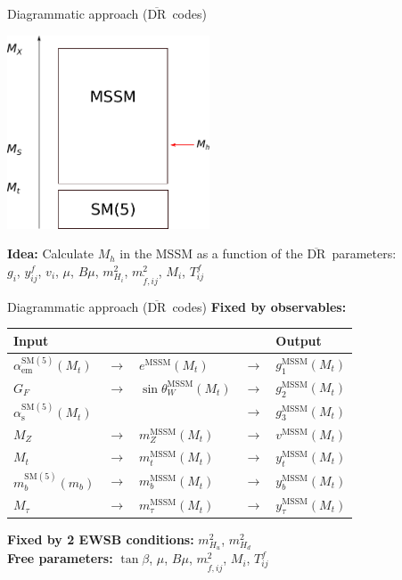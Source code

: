 \documentclass[hyperref={pdfpagelabels=false},ngerman]{beamer}
\renewcommand{\emph}{\textbf}
\newcommand{\DRbar}{\ensuremath{\overline{\text{DR}}}}
\newcommand{\SM}{\ensuremath{\text{SM}}}
\newcommand{\MSSM}{\ensuremath{\text{MSSM}}}
\begin{document}
\begin{frame}{Diagrammatic approach (\DRbar\ codes)}
  \begin{center}
    \includegraphics[width=0.45\textwidth]{images/mssm-sm-tower-diagrammatic}\\[1em]
  \end{center}
  \emph{Idea:} Calculate $M_h$ in the MSSM as a function of the \DRbar\ parameters:\\[1em]
  \centering $g_i$, $y^f_{ij}$, $v_i$, $\mu$, $B\mu$, $m^2_{H_i}$,
  $m_{\tilde{f},ij}^2$, $M_i$, $T^f_{ij}$
\end{frame}

\begin{frame}{Diagrammatic approach (\DRbar\ codes)}
  \emph{Fixed by observables:}
  \begin{table}
    \centering
    \begin{tabular}{lllll}
      Input & & & & Output \\
      \midrule
      $\alpha_\text{em}^{\SM(5)}(M_t)$ & $\rightarrow$ & $e^\MSSM(M_t)$ & $\rightarrow$ & $g_1^\MSSM(M_t)$ \\
      $G_F$ & $\rightarrow$ & $\sin\theta_W^\MSSM(M_t)$ & $\rightarrow$ & $g_2^\MSSM(M_t)$ \\
      $\alpha_\text{s}^{\SM(5)}(M_t)$ & & & $\rightarrow$ & $g_3^\MSSM(M_t)$ \\
      $M_Z$ & $\rightarrow$ & $m_Z^\MSSM(M_t)$ & $\rightarrow$ & $v^\MSSM(M_t)$ \\
      $M_t$ & $\rightarrow$ & $m_t^\MSSM(M_t)$ & $\rightarrow$ & $y_t^\MSSM(M_t)$ \\
      $m_b^{\SM(5)}(m_b)$ & $\rightarrow$ & $m_b^\MSSM(M_t)$ & $\rightarrow$ & $y_b^\MSSM(M_t)$ \\
      $M_\tau$ & $\rightarrow$ & $m_\tau^\MSSM(M_t)$ & $\rightarrow$ & $y_\tau^\MSSM(M_t)$ \\
    \end{tabular}
  \end{table}
  \emph{Fixed by 2 EWSB conditions:} $m^2_{H_u}$, $m^2_{H_d}$ \\[1em]
  \emph{Free parameters:} $\tan\beta$, $\mu$, $B\mu$, $m_{\tilde{f},ij}^2$, $M_i$,
  $T^f_{ij}$
\end{frame}
\end{document}
